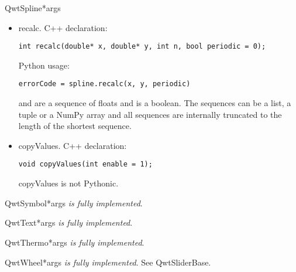 \documentclass{manual}
\begin{document}
\begin{classdesc}{QwtSpline}{*args}
  
  \begin{itemize}

    \item{recalc}. C++ declaration:
      \begin{verbatim}
int recalc(double* x, double* y, int n, bool periodic = 0);
      \end{verbatim}
      Python usage:
      \begin{verbatim}
errorCode = spline.recalc(x, y, periodic)
      \end{verbatim}
       and  are a sequence of floats and  is a
      boolean.
      The sequences can be a list, a tuple or a NumPy array and all sequences
      are internally truncated to the length of the shortest sequence.

    \item{copyValues}. C++ declaration:
      \begin{verbatim}
void copyValues(int enable = 1);
      \end{verbatim}
      copyValues is not Pythonic.

  \end{itemize}
\end{classdesc}
 
\begin{classdesc}{QwtSymbol}{*args}
\emph{is fully implemented}.
\end{classdesc}

\begin{classdesc}{QwtText}{*args}
\emph{is fully implemented}.
\end{classdesc}

\begin{classdesc}{QwtThermo}{*args}
\emph{is fully implemented}.
\end{classdesc}

\begin{classdesc}{QwtWheel}{*args}
\emph{is fully implemented}. See QwtSliderBase.
\end{classdesc}

\renewcommand{\indexname}{Index}

\end{document}
